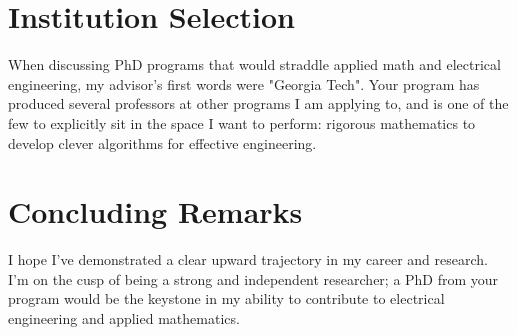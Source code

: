 \documentclass[letterpaper]{article}
\begin{document}
\section*{Institution Selection}
When discussing PhD programs that would straddle applied math and electrical engineering, my
advisor's first words were "Georgia Tech". Your program has produced several professors at other
programs I am applying to, and is one of the few to explicitly sit in the space I want to perform:
rigorous mathematics to develop clever algorithms for effective engineering.

\section*{Concluding Remarks}
I hope I've demonstrated a clear upward trajectory in my career and research.
I'm on the cusp of being a strong and independent researcher; a PhD from your program
would be the keystone in my ability to contribute to electrical engineering and applied
mathematics.
\end{document}
